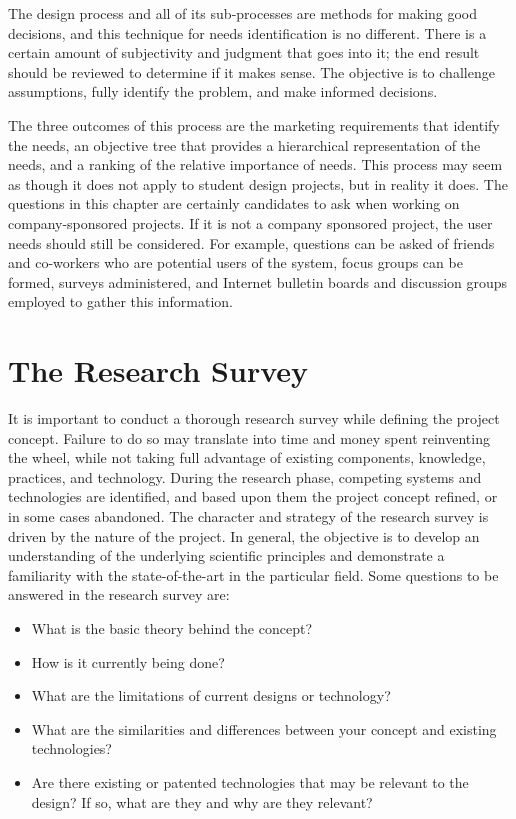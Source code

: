 The design process and all of its sub-processes are methods for making
good decisions, and this technique for needs identification is no
different. There is a certain amount of subjectivity and judgment that
goes into it; the end result should be reviewed to determine if it makes
sense. The objective is to challenge assumptions, fully identify the
problem, and make informed decisions.

The three outcomes of this process are the marketing requirements that
identify the needs, an objective tree that provides a hierarchical
representation of the needs, and a ranking of the relative importance of
needs. This process may seem as though it does not apply to student
design projects, but in reality it does. The questions in this chapter
are certainly candidates to ask when working on company-sponsored
projects. If it is not a company sponsored project, the user needs
should still be considered. For example, questions can be asked of
friends and co-workers who are potential users of the system, focus
groups can be formed, surveys administered, and Internet bulletin boards
and discussion groups employed to gather this information.

\section{The Research Survey}
\label{section:the-research-survey}

It is important to conduct a thorough research survey while defining the
project concept. Failure to do so may translate into time and money
spent reinventing the wheel, while not taking full advantage of existing
components, knowledge, practices, and technology. During the research
phase, competing systems and technologies are identified, and based upon
them the project concept refined, or in some cases abandoned. The
character and strategy of the research survey is driven by the nature of
the project. In general, the objective is to develop an understanding of
the underlying scientific principles and demonstrate a familiarity with
the state-of-the-art in the particular field. Some questions to be
answered in the research survey are:

\begin{itemize}
\item
  What is the basic theory behind the concept?
\item
  How is it currently being done?
\item
  What are the limitations of current designs or technology?
\item
  What are the similarities and differences between your concept and
  existing technologies?
\item
  Are there existing or patented technologies that may be relevant to
  the design? If so, what are they and why are they relevant?
\end{itemize}

